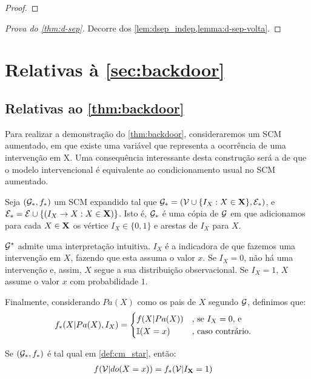 \begin{proof}
\end{proof}

\begin{proof}[Prova do \cref{thm:d-sep}]
 Decorre dos 
 \cref{lem:dsep_indep,lemma:d-sep-volta}.
\end{proof}

\section{Relativas à \cref{sec:backdoor}}

\subsection{Relativas ao \cref{thm:backdoor}}

Para realizar a demonstração do \cref{thm:backdoor},
consideraremos um SCM aumentado, 
em que existe uma variável que representa
a ocorrência de uma intervenção em X.
Uma consequência interessante desta construção será
a de que o modelo intervencional é equivalente
ao condicionamento usual no SCM aumentado.

\begin{definition}
 \label{def:cm_star}
 Seja $({\mathcal G}_*, f_*)$ um SCM expandido tal que
 ${\mathcal G}_* = ({\mathcal V} \cup \{I_X: X \in {\mathbf{X}}\}, {\mathcal E}_*)$, e
 ${\mathcal E}_* = {\mathcal E} \cup \{(I_X \rightarrow X: X \in {\mathbf{X}})\}$.
 Isto é, ${\mathcal G}_*$ é uma cópia de ${\mathcal G}$ em que
 adicionamos para cada $X \in {\mathbf{X}}$
 os vértice $I_X \in \{0,1\}$ e 
 arestas de $I_X$ para $X$.
 
 ${\mathcal G}^*$ admite uma interpretação intuitiva.
 $I_X$ é a indicadora de que fazemos uma intervenção em $X$,
 fazendo que esta assuma o valor $x$.
 Se $I_X = 0$, não há uma intervenção e, assim,
 $X$ segue a sua distribuição observacional.
 Se $I_X = 1$, $X$ assume o valor $x$ com probabilidade $1$.
 
 Finalmente, considerando $Pa(X)$ como os
 pais de $X$ segundo ${\mathcal G}$, definimos que:
 \begin{align*}
  f_*(X|Pa(X), I_X) 
  &= \begin{cases}
   f(X|Pa(X)) & \text{, se $I_X = 0$, e} \\
   {\mathbb I}(X = x) & \text{, caso contrário.}
  \end{cases}
 \end{align*}
\end{definition}

\begin{lemma}
 \label{lemma:backdoor_1}
 Se $({\mathcal G}_*, f_*)$ é tal qual em \cref{def:cm_star}, então:
 \begin{align*}
  f({\mathcal V}|do(X=x)) &= f_*({\mathcal V}|I_{{\mathbf{X}}}=1)
 \end{align*}
\end{lemma}


